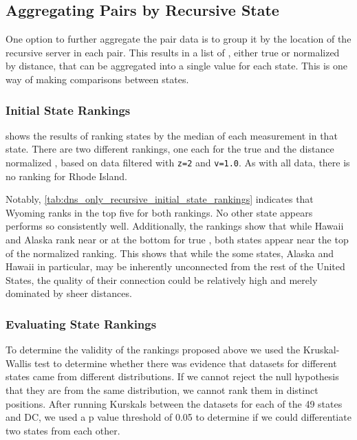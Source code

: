 \subsection{Aggregating Pairs by Recursive State}

One option to further aggregate the pair data is to group it by the location of the recursive server in each pair. This results in a list of \rtts, either true or normalized by distance, that can be aggregated into a single value for each state. This is one way of making comparisons between states.

\subsubsection{Initial State Rankings}

 shows the results of ranking states by the median of each measurement in that state. There are two different rankings, one each for the true \rtt and the distance normalized \rtt, based on data filtered with \texttt{z=2} and \texttt{v=1.0}. As with all \dns data, there is no ranking for Rhode Island.



Notably, \cref{tab:dns_only_recursive_initial_state_rankings} indicates that Wyoming ranks in the top five for both rankings. No other state appears performs so consistently well. Additionally, the rankings show that while Hawaii and Alaska rank near or at the bottom for true \rtt, both states appear near the top of the normalized ranking. This shows that while the some states, Alaska and Hawaii in particular, may be inherently unconnected from the rest of the United States, the quality of their connection could be relatively high and merely dominated by sheer distances.

\subsubsection{Evaluating State Rankings}

To determine the validity of the rankings proposed above we used the Kruskal-Wallis test to determine whether there was evidence that datasets for different states came from different distributions. If we cannot reject the null hypothesis that they are from the same distribution, we cannot rank them in distinct positions. After running Kurskals between the datasets for each of the 49 states and DC, we used a p value threshold of 0.05 to determine if we could differentiate two states from each other. 

